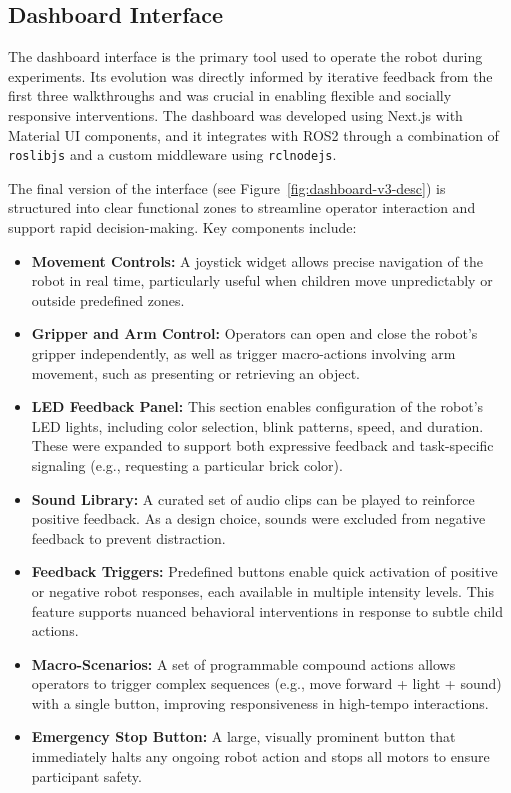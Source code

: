 \documentclass[a4paper]{usiinfbachelorproject}
\begin{document}
\subsection{\textbf{Dashboard Interface}}

The dashboard interface is the primary tool used to operate the robot during experiments.
Its evolution was directly informed by iterative feedback from the first three walkthroughs and was crucial in enabling flexible and socially responsive interventions.
The dashboard was developed using Next.js with Material UI components, and it integrates with ROS2 through a combination of \texttt{roslibjs} and a custom middleware using \texttt{rclnodejs}.

The final version of the interface (see Figure~\ref{fig:dashboard-v3-desc}) is structured into clear functional zones to streamline operator interaction and support rapid decision-making.
Key components include:

\begin{itemize}
    \item \textbf{Movement Controls:} A joystick widget allows precise navigation of the robot in real time, particularly useful when children move unpredictably or outside predefined zones.
    \item \textbf{Gripper and Arm Control:} Operators can open and close the robot's gripper independently, as well as trigger macro-actions involving arm movement, such as presenting or retrieving an object.
    \item \textbf{LED Feedback Panel:} This section enables configuration of the robot's LED lights, including color selection, blink patterns, speed, and duration. These were expanded to support both expressive feedback and task-specific signaling (e.g., requesting a particular brick color).
    \item \textbf{Sound Library:} A curated set of audio clips can be played to reinforce positive feedback. As a design choice, sounds were excluded from negative feedback to prevent distraction.
    \item \textbf{Feedback Triggers:} Predefined buttons enable quick activation of positive or negative robot responses, each available in multiple intensity levels. This feature supports nuanced behavioral interventions in response to subtle child actions.
    \item \textbf{Macro-Scenarios:} A set of programmable compound actions allows operators to trigger complex sequences (e.g., move forward + light + sound) with a single button, improving responsiveness in high-tempo interactions.
    \item \textbf{Emergency Stop Button:} A large, visually prominent button that immediately halts any ongoing robot action and stops all motors to ensure participant safety.\end{itemize}
\end{document}

